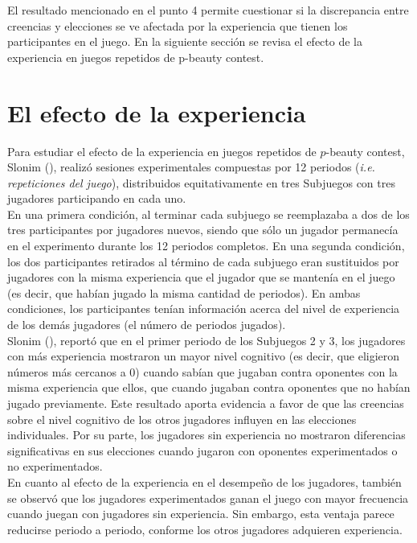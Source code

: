 El resultado mencionado en el punto 4 permite cuestionar si la discrepancia entre creencias y elecciones se ve afectada por la experiencia que tienen los participantes en el juego.  En la siguiente sección se revisa el efecto de la experiencia en juegos repetidos de p-beauty contest.

\section{El efecto de la experiencia}

Para estudiar el efecto de la experiencia en juegos repetidos de $p$-beauty contest, Slonim (\citeyear{Slonim}), realizó sesiones experimentales compuestas por 12 periodos (\textit{i.e. repeticiones del juego}), distribuidos equitativamente en tres Subjuegos con tres jugadores participando en cada uno.\\

En una primera condición, al terminar cada subjuego se reemplazaba a dos de los tres participantes por jugadores nuevos, siendo que sólo un jugador permanecía en el experimento durante los 12 periodos completos. En una segunda condición, los dos participantes retirados al término de cada subjuego eran sustituidos por jugadores con la misma experiencia que el jugador que se mantenía en el juego (es decir, que habían jugado la misma cantidad de periodos). En ambas condiciones, los participantes tenían información acerca del nivel de experiencia de los demás jugadores (el número de periodos jugados).\\

Slonim (\citeyear{Slonim}), reportó que en el primer periodo de los Subjuegos 2 y 3, los jugadores con más experiencia mostraron un mayor nivel cognitivo (es decir, que eligieron números más cercanos a 0) cuando sabían que jugaban contra oponentes con la misma experiencia que ellos, que cuando jugaban contra oponentes que no habían jugado previamente. Este resultado aporta evidencia a favor de que las creencias sobre el nivel cognitivo de los otros jugadores influyen en las elecciones individuales. Por su parte, los jugadores sin experiencia no mostraron diferencias signiﬁcativas en sus elecciones cuando jugaron con oponentes experimentados o no experimentados.\\

En cuanto al efecto de la experiencia en el desempeño de los jugadores, también se observó que los jugadores experimentados ganan el juego con mayor frecuencia cuando juegan con jugadores sin experiencia. Sin embargo, esta ventaja parece reducirse periodo a periodo, conforme los otros jugadores adquieren experiencia.\\

